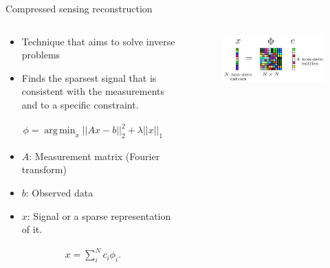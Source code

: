 \documentclass[xetex,aspectratio=169]{beamer}
\DeclareMathOperator*{\argmin}{arg\,min}
\begin{document}
\begin{frame}{Compressed sensing reconstruction}
	\scriptsize
	\begin{columns}[onlytextwidth,t]
		\begin{column}{.5\textwidth}
			\begin{itemize}
				\item Technique that aims to solve inverse problems
				\item Finds the sparsest signal that is consistent with the measurements and to a specific constraint.
			\end{itemize}

			\begin{align*}
				\phi = \argmin_x ||Ax-b||_2^2 + \lambda ||x||_1
			\end{align*}

			\begin{itemize}
				\item $A$: Measurement matrix (Fourier transform)
				\item $b$: Observed data
				\item $x$: Signal or a sparse representation of it.
			\end{itemize}

			\begin{align*}
				x=\sum_i^N c_i\phi_i.
			\end{align*}
		\end{column}

		\begin{column}{.5\textwidth}
			\vspace{1.5cm}
			\begin{figure}
				\centering
				\includegraphics[width=\textwidth]{figures/compressed_sensing.png}
			\end{figure}
		\end{column}

	\end{columns}
\end{frame}
\end{document}
